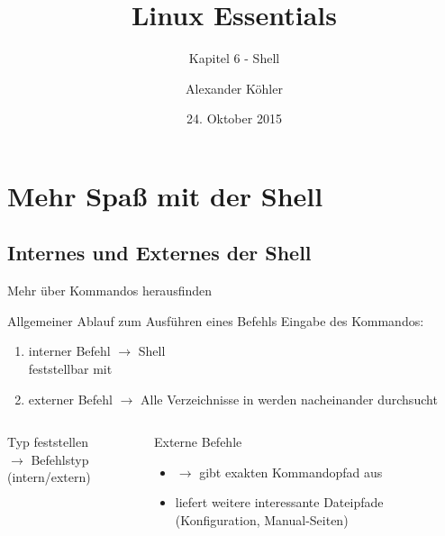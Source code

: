 \documentclass[aspectratio=43]{beamer}
\title[Linux Essentials  - Kapitel 6 - Mehr Shell]{Linux Essentials}
\subtitle{Kapitel 6 - Shell}
\author{Alexander Köhler}
\date{24. Oktober 2015}
\begin{document}
\logoframe

\frame{\titlepage}

\setcounter{tocdepth}{1}
\section[Gliederung]{}
\frame{\tableofcontents}


\section{Mehr Spaß mit der Shell}
\subsection{Internes und Externes der Shell}
\begin{frame}{Mehr über Kommandos herausfinden}
      \begin{block}{Allgemeiner Ablauf zum Ausführen eines Befehls}
          Eingabe des Kommandos:
          \begin{enumerate}
            \item interner Befehl $\rightarrow$ Shell\\
              feststellbar mit 
            \item externer Befehl 
              $\rightarrow$ Alle Verzeichnisse in  werden nacheinander
              durchsucht
          \end{enumerate}
      \end{block}
  \begin{columns}
    \begin{column}{0.3\textwidth}
      \begin{block}{Typ feststellen}
             \\$\rightarrow$  Befehlstyp (intern/extern)
      \end{block}
    \end{column}
    \begin{column}{0.75\textwidth}
      \begin{block}{Externe Befehle}
            \begin{itemize}
              \item {} $\rightarrow$ gibt exakten Kommandopfad aus
              \item {} liefert weitere interessante Dateipfade (Konfiguration, Manual-Seiten)
            \end{itemize}
      \end{block}
    \end{column}
  \end{columns}
\end{frame}
\end{document}
